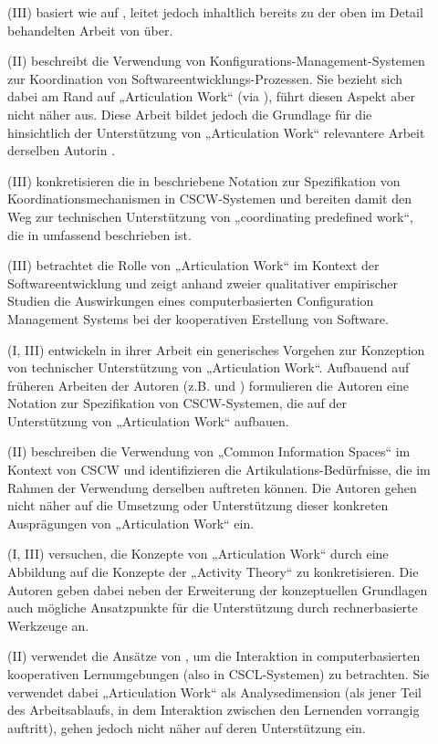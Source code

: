 \begin{description}
	\item[\citet{Schmidt95}] (III) basiert wie \citep{Schmidt94} auf \citep{Schmidt90}, leitet jedoch inhaltlich bereits zu der oben im Detail behandelten Arbeit von \citet{Schmidt96} über.
	\item[\citet{Grinter95}] (II) beschreibt die Verwendung von Konfigurations-Management-Systemen zur Koordination von Softwareentwicklungs-Prozessen. Sie bezieht sich dabei am Rand auf „Articulation Work“ (via \citep{Schmidt92}), führt diesen Aspekt aber nicht näher aus. Diese Arbeit bildet jedoch die Grundlage für die hinsichtlich der Unterstützung von „Articulation Work“ relevantere Arbeit derselben Autorin \citep{Grinter96}.
	\item[\citet{Simone95}] (III) konkretisieren die in \citet{Schmidt96} beschriebene Notation zur Spezifikation von Koordinationsmechanismen in \gls{CSCW}-Systemen und bereiten damit den Weg zur technischen Unterstützung von „coordinating predefined work“, die in \citep{Divitini00} umfassend beschrieben ist.
	\item[\citet{Grinter96}] (III) betrachtet die Rolle von „Articulation Work“ im Kontext der Softwareentwicklung und zeigt anhand zweier qualitativer empirischer Studien die Auswirkungen eines computerbasierten Configuration Management Systems bei der kooperativen Erstellung von Software.
	\item[\citet{Schmidt96}] (I, III) entwickeln in ihrer Arbeit ein generisches Vorgehen zur Konzeption von technischer Unterstützung von „Articulation Work“. Aufbauend auf früheren Arbeiten der Autoren (z.B. \citep{Schmidt90} und \citep{Schmidt92}) formulieren die Autoren eine Notation zur Spezifikation von \gls{CSCW}-Systemen, die auf der Unterstützung von „Articulation Work“ aufbauen.
	\item[\citet{Bannon97}] (II) beschreiben die Verwendung von „Common Information Spaces“ im Kontext von \gls{CSCW} und identifizieren die Artikulations-Bedürfnisse, die im Rahmen der Verwendung derselben auftreten können. Die Autoren gehen nicht näher auf die Umsetzung oder Unterstützung dieser konkreten Ausprägungen von „Articulation Work“ ein.
	\item[\citet{Fjuk97}] (I, III) versuchen, die Konzepte von „Articulation Work“ durch eine Abbildung auf die Konzepte der „Activity Theory“ zu konkretisieren. Die Autoren geben dabei neben der Erweiterung der konzeptuellen Grundlagen auch mögliche Ansatzpunkte für die Unterstützung durch rechnerbasierte Werkzeuge an.
	\item[\citet{Fjuk97a}] (II) verwendet die Ansätze von \citet{Strauss93}, um die Interaktion in computerbasierten kooperativen Lernumgebungen (also in \gls{CSCL}-Systemen) zu betrachten. Sie verwendet dabei „Articulation Work“ als Analysedimension (als jener Teil des Arbeitsablaufs, in dem Interaktion zwischen den Lernenden vorrangig auftritt), gehen jedoch nicht näher auf deren Unterstützung ein.

\end{description}

